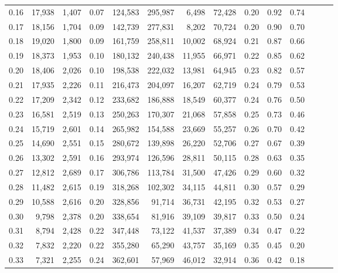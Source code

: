 \begin{tabular}{rrrrrrrrrrrrrr}
0.16 &  17,938 &  1,407 &  0.07 &  124,583 &  295,987 &   6,498 &  72,428 &  0.20 &  0.92 &      0.74 \\
0.17 &  18,156 &  1,704 &  0.09 &  142,739 &  277,831 &   8,202 &  70,724 &  0.20 &  0.90 &      0.70 \\
0.18 &  19,020 &  1,800 &  0.09 &  161,759 &  258,811 &  10,002 &  68,924 &  0.21 &  0.87 &      0.66 \\
0.19 &  18,373 &  1,953 &  0.10 &  180,132 &  240,438 &  11,955 &  66,971 &  0.22 &  0.85 &      0.62 \\
0.20 &  18,406 &  2,026 &  0.10 &  198,538 &  222,032 &  13,981 &  64,945 &  0.23 &  0.82 &      0.57 \\
0.21 &  17,935 &  2,226 &  0.11 &  216,473 &  204,097 &  16,207 &  62,719 &  0.24 &  0.79 &      0.53 \\
0.22 &  17,209 &  2,342 &  0.12 &  233,682 &  186,888 &  18,549 &  60,377 &  0.24 &  0.76 &      0.50 \\
0.23 &  16,581 &  2,519 &  0.13 &  250,263 &  170,307 &  21,068 &  57,858 &  0.25 &  0.73 &      0.46 \\
0.24 &  15,719 &  2,601 &  0.14 &  265,982 &  154,588 &  23,669 &  55,257 &  0.26 &  0.70 &      0.42 \\
0.25 &  14,690 &  2,551 &  0.15 &  280,672 &  139,898 &  26,220 &  52,706 &  0.27 &  0.67 &      0.39 \\
0.26 &  13,302 &  2,591 &  0.16 &  293,974 &  126,596 &  28,811 &  50,115 &  0.28 &  0.63 &      0.35 \\
0.27 &  12,812 &  2,689 &  0.17 &  306,786 &  113,784 &  31,500 &  47,426 &  0.29 &  0.60 &      0.32 \\
0.28 &  11,482 &  2,615 &  0.19 &  318,268 &  102,302 &  34,115 &  44,811 &  0.30 &  0.57 &      0.29 \\
0.29 &  10,588 &  2,616 &  0.20 &  328,856 &   91,714 &  36,731 &  42,195 &  0.32 &  0.53 &      0.27 \\
0.30 &   9,798 &  2,378 &  0.20 &  338,654 &   81,916 &  39,109 &  39,817 &  0.33 &  0.50 &      0.24 \\
0.31 &   8,794 &  2,428 &  0.22 &  347,448 &   73,122 &  41,537 &  37,389 &  0.34 &  0.47 &      0.22 \\
0.32 &   7,832 &  2,220 &  0.22 &  355,280 &   65,290 &  43,757 &  35,169 &  0.35 &  0.45 &      0.20 \\
0.33 &   7,321 &  2,255 &  0.24 &  362,601 &   57,969 &  46,012 &  32,914 &  0.36 &  0.42 &      0.18 \\

\end{tabular}
